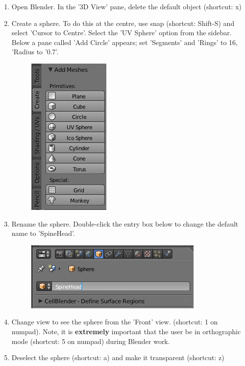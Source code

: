 \documentclass[twoside,a4paper]{refart}
\begin{document}
\begin{enumerate}

\item   Open Blender. In the '3D View' pane, delete the default object (shortcut: x)
    
\item   Create a sphere. To do this at the centre, use snap (shortcut: Shift-S) and select 'Cursor to Centre'. Select the 'UV Sphere' option from the sidebar. Below a pane called 'Add Circle' appears; set 'Segments' and 'Rings' to 16, 'Radius to '0.7'. 
        \begin{figure}[H]
        \includegraphics[scale=0.5]{spinehead1.png}
        \end{figure}

\item   Rename the sphere. Double-click the entry box below to change the default name to 'SpineHead'.
        \begin{figure}[H]
        \includegraphics[scale=0.5]{spinehead2.png}
        \end{figure}

    \item   Change view to see the sphere from the 'Front' view. (shortcut: 1 on numpad). Note, it is \textbf{extremely} important that the user be in orthographic mode (shortcut: 5 on numpad) during Blender work.

\item   Deselect the sphere (shortcut: a) and make it transparent (shortcut: z)


\end{enumerate}
\end{document}
